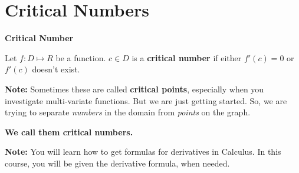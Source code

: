 \documentclass{ximera}
\begin{document}
\section*{Critical Numbers}




\begin{idea} \textbf{\textcolor{blue!55!black}{Critical Number}}

Let $f: D \mapsto R$ be a function. 
$c \in D$ is a \textbf{critical number} if  either $f'(c) = 0$ or $f'(c)$ doesn't exist.


\end{idea}


\textbf{Note:}  Sometimes these are called \textbf{critical points}, especially when you investigate multi-variate functions.  But we are just getting started.  So, we are trying to separate \textit{numbers} in the domain from \textit{points} on the graph. 



\begin{center}


\textbf{\textcolor{purple!85!blue}{We call them critical numbers.}}

\end{center}


\textbf{Note:} You will learn how to get formulas for derivatives in Calculus.  In this course, you will be given the derivative formula, when needed. 
\end{document}
